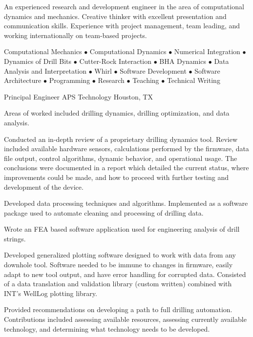 \documentclass{leresume}
\begin{document}
	\thispagestyle{lefooterhorizontalline}
	\makeresumeheaderC
	
	An experienced research and development engineer in the area of computational dynamics and mechanics. Creative thinker with excellent presentation and communication skills. Experience with project management, team leading, and working internationally on team-based projects.

	Computational Mechanics $\bullet$ Computational Dynamics $\bullet$ Numerical Integration $\bullet$ Dynamics of Drill Bits $\bullet$ Cutter-Rock Interaction $\bullet$ BHA Dynamics $\bullet$ Data Analysis and Interpretation $\bullet$ Whirl $\bullet$ Software Development $\bullet$ Software Architecture $\bullet$ Programming $\bullet$ Research $\bullet$ Teaching $\bullet$ Technical Writing

    
            {Principal Engineer}
            {APS Technology}
			{Houston, TX}
			
					\noindent Areas of worked included drilling dynamics, drilling optimization, and data analysis.
		\begin{bulletedlist}
			
		\item 
					Conducted an in-depth review of a proprietary drilling dynamics tool.  Review included available hardware sensors, calculations performed by the firmware, data file output, control algorithms, dynamic behavior, and operational usage.  The conclusions were documented in a report which detailed the current status, where improvements could be made, and how to proceed with further testing and development of the device.
				
		\item 
					Developed data processing techniques and algorithms.  Implemented as a software package used to automate cleaning and processing of drilling data.
				
		\item 
					Wrote an FEA based software application used for engineering analysis of drill strings.
				
		\item 
					Developed generalized plotting software designed to work with data from any downhole tool.  Software needed to be immune to changes in firmware, easily adapt to new tool output, and have error handling for corrupted data.  Consisted of a data translation and validation library (custom written) combined with INT's WellLog plotting library.
				
		\item 
					Provided recommendations on developing a path to full drilling automation.  Contributions included assessing available resources, assessing currently available technology, and determining what technology needs to be developed.
				
		\end{bulletedlist}
			\vspace*{-12pt}
	\hspace*{0pt}\\ \vspace*{-2pt}
				
\end{document}
